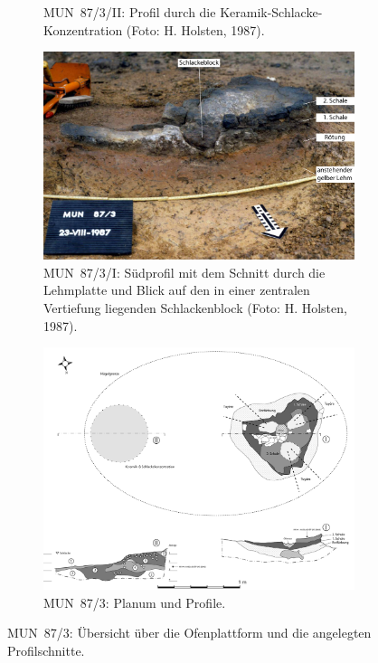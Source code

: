\begin{figure}[p]
\begin{subfigure}[t]{\columnwidth}
		\caption{MUN~87/3/II: Profil durch die Keramik-Schlacke-Konzentration (Foto: H. Holsten, 1987).}
		\label{fig:MUN87.3.II-3_Foto}
	\end{subfigure}\hfill
	\begin{subfigure}[t]{\columnwidth}
		\includegraphics[width=\textwidth]{fig/MUN87-3-I_H-87-05-9_kompr.pdf}
		\caption{MUN~87/3/I: Südprofil mit dem Schnitt durch die Lehmplatte und Blick auf den in einer zentralen Vertiefung liegenden Schlackenblock (Foto: H. Holsten, 1987).}
		\label{fig:MUN87-3_Profile}
	\end{subfigure}
	\begin{subfigure}{\linewidth}
		\includegraphics[width=.9\textwidth]{fig/MUN87-3.pdf}
		\caption{MUN~87/3: Planum und Profile.}
		\label{fig:MUN87.3_PlanumProfile}
	\end{subfigure}
	\caption{MUN~87/3: Übersicht über die Ofenplattform und die angelegten Profilschnitte.}
	\label{fig:MUN87.3.I_Planum+ProfilSüd_Foto}
\end{figure}

